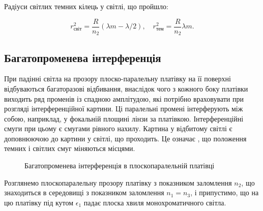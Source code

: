Радіуси світлих темних кілець у світлі, що пройшло:

\begin{equation}
	\label{rdark2}
	r_\text{світ}^2=\frac{R}{n_2}(\lambda m-\lambda/2), \quad r_\text{тем}^2=\frac{R}{n_2}\lambda m.
\end{equation}





\subsection*{Багатопроменева інтерференція}


При падінні світла на прозору плоско-паралельну платівку на її поверхні відбуваються багаторазові відбивання, внаслідок чого з кожного боку платівки виходить ряд променів із спадною амплітудою, які потрібно враховувати при розгляді інтерференційної картини. Ці паралельні промені інтерферують між собою, наприклад, у фокальній площині лінзи за платівкою. Інтерференційні смуги при цьому є смугами рівного нахилу. Картина у відбитому світлі є доповнюючою до картини у світлі, що проходить. Це означає , що положення темних і світлих смуг міняються місцями.


\begin{figure}[h!]\centering
	\def\N{5} %
    
	\caption{Багатопроменева інтерференція в плоскопаралельній платівці}
	\label{pic:unterferece_in_film}
\end{figure}

Розглянемо плоскопаралельну прозору платівку з показником заломлення $n_2$, що знаходиться в середовищі з показником заломлення $n_1 = n_3$, і припустимо, що на цю платівку під кутом $\epsilon_1$ падає плоска хвиля монохроматичного світла.


